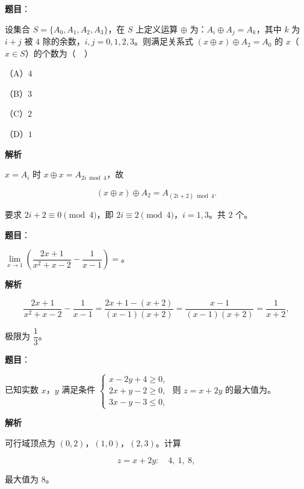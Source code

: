 \begin{answer}

\textbf{题目}：

设集合 $S=\{A_0,A_1,A_2,A_3\}$，在 $S$ 上定义运算 $\oplus$ 为：$A_i\oplus A_j=A_k$，其中 $k$ 为 $i+j$ 被 $4$ 除的余数，$i,j=0,1,2,3$。则满足关系式 $(x\oplus x)\oplus A_2=A_0$ 的 $x$（$x\in S$）的个数为（　）

（A）$4$

（B）$3$

（C）$2$

（D）$1$

\textbf{解析}

$x=A_i$ 时 $x\oplus x=A_{2i\bmod4}$，故

\nopagebreak[4]
\[(x\oplus x)\oplus A_2=A_{(2i+2)\bmod4}.\]

要求 $2i+2\equiv0\pmod4$，即 $2i\equiv2\pmod4$，$i=1,3$。共 $2$ 个。


\end{answer}
\begin{answer}

\textbf{题目}：

$\lim\limits_{x\to1}\left(\dfrac{2x+1}{x^2+x-2}-\dfrac1{x-1}\right)=$\gkblank{}。

\textbf{解析}

\nopagebreak[4]
\[\frac{2x+1}{x^2+x-2}-\frac1{x-1}
=\frac{2x+1-(x+2)}{(x-1)(x+2)}
=\frac{x-1}{(x-1)(x+2)}=\frac1{x+2},\]

极限为 $\dfrac13$。


\end{answer}
\begin{answer}

\textbf{题目}：

已知实数 $x$，$y$ 满足条件 $\begin{cases}x-2y+4\geqslant0,\\ 2x+y-2\geqslant0,\\ 3x-y-3\leqslant0,\end{cases}$ 则 $z=x+2y$ 的最大值为\gkblank{}。

\textbf{解析}

可行域顶点为 $(0,2)$，$(1,0)$，$(2,3)$。计算

\nopagebreak[4]
\[z=x+2y:\quad4,\ 1,\ 8,\]

最大值为 $8$。


\end{answer}
